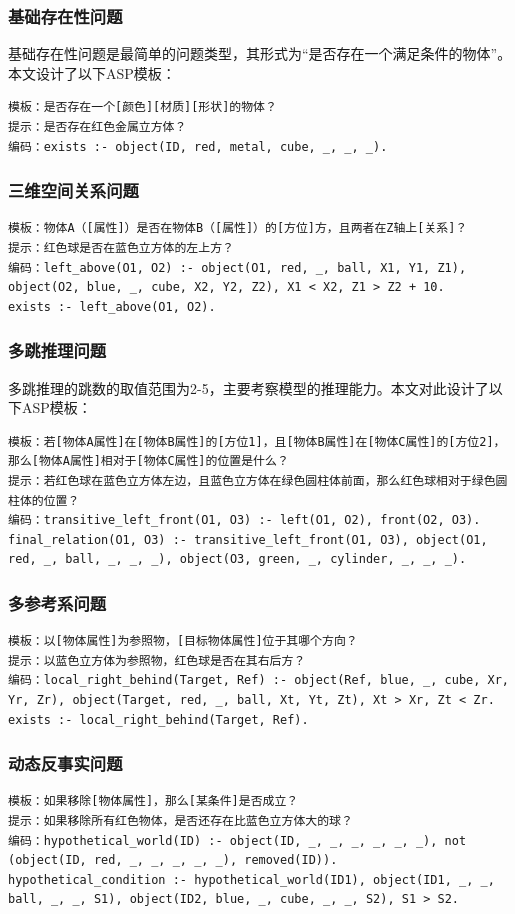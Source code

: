 \subsubsection{基础存在性问题}
基础存在性问题是最简单的问题类型，其形式为“是否存在一个满足条件的物体”。本文设计了以下ASP模板：
\begin{lstlisting}
模板：是否存在一个[颜色][材质][形状]的物体？
提示：是否存在红色金属立方体？
编码：exists :- object(ID, red, metal, cube, _, _, _).
\end{lstlisting}
\subsubsection{三维空间关系问题}
\begin{lstlisting}
模板：物体A（[属性]）是否在物体B（[属性]）的[方位]方，且两者在Z轴上[关系]？
提示：红色球是否在蓝色立方体的左上方？
编码：left_above(O1, O2) :- object(O1, red, _, ball, X1, Y1, Z1), object(O2, blue, _, cube, X2, Y2, Z2), X1 < X2, Z1 > Z2 + 10.
exists :- left_above(O1, O2).
\end{lstlisting}
\subsubsection{多跳推理问题}
多跳推理的跳数的取值范围为2-5，主要考察模型的推理能力。本文对此设计了以下ASP模板：
\begin{lstlisting}
模板：若[物体A属性]在[物体B属性]的[方位1]，且[物体B属性]在[物体C属性]的[方位2]，那么[物体A属性]相对于[物体C属性]的位置是什么？
提示：若红色球在蓝色立方体左边，且蓝色立方体在绿色圆柱体前面，那么红色球相对于绿色圆柱体的位置？
编码：transitive_left_front(O1, O3) :- left(O1, O2), front(O2, O3).
final_relation(O1, O3) :- transitive_left_front(O1, O3), object(O1, red, _, ball, _, _, _), object(O3, green, _, cylinder, _, _, _).
\end{lstlisting}
\subsubsection{多参考系问题}
\begin{lstlisting}
模板：以[物体属性]为参照物，[目标物体属性]位于其哪个方向？
提示：以蓝色立方体为参照物，红色球是否在其右后方？
编码：local_right_behind(Target, Ref) :- object(Ref, blue, _, cube, Xr, Yr, Zr), object(Target, red, _, ball, Xt, Yt, Zt), Xt > Xr, Zt < Zr.
exists :- local_right_behind(Target, Ref).
\end{lstlisting}
\subsubsection{动态反事实问题}
\begin{lstlisting}
模板：如果移除[物体属性]，那么[某条件]是否成立？
提示：如果移除所有红色物体，是否还存在比蓝色立方体大的球？
编码：hypothetical_world(ID) :- object(ID, _, _, _, _, _, _), not (object(ID, red, _, _, _, _, _), removed(ID)).
hypothetical_condition :- hypothetical_world(ID1), object(ID1, _, _, ball, _, _, S1), object(ID2, blue, _, cube, _, _, S2), S1 > S2.
\end{lstlisting}
